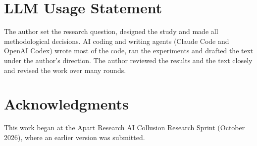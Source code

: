 \documentclass[letterpaper]{article} %
\begin{document}
\section*{LLM Usage Statement}
The author set the research question, designed the study and made all methodological decisions.
AI coding and writing agents (Claude Code and OpenAI Codex) wrote most of the code, ran the experiments and drafted the text under the author's direction.
The author reviewed the results and the text closely and revised the work over many rounds.

\section*{Acknowledgments}
This work began at the Apart Research AI Collusion Research Sprint (October 2026), where an earlier version was submitted.



\clearpage
\onecolumn
\appendix
{}

\end{document}
